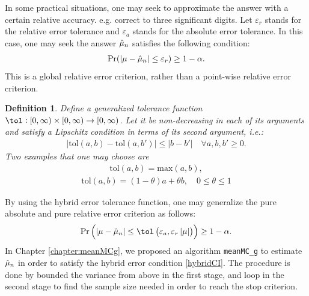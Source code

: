 \documentclass{iitthesis}
\newtheorem{defn}{Definition}[theorem]
\begin{document}
In some practical situations, one may seek to approximate the answer with a certain relative accuracy. e.g. correct to three significant digits. Let $\varepsilon_r$ stands for the relative error tolerance and $\varepsilon_a$ stands for the absolute error tolerance. In this case, one may seek the answer $\hat{\mu}_n$ satisfies the following condition:
\begin{align}\label{relCI}
\Pr(\left \lvert \mu-\hat{\mu}_n \right \rvert\leq \varepsilon_r) \geq 1-\alpha.
\end{align}
This is a global relative error criterion, rather than a point-wise relative error criterion. 
\begin{defn}\label{def:tolfun}
 Define a generalized tolerance function $\tol: [0, \infty) \times [0, \infty) \to [0,\infty)$. Let it be non-decreasing in each of its arguments and satisfy a Lipschitz condition in terms of its second argument, i.e.:
\begin{align}
|\text{tol}(a,b)-\text{tol}(a,b')| \leq |b-b'| \quad \forall a,b,b' \geq 0.
\end{align}
Two examples that one may choose are
\begin{align}
\text{tol}(a,b) = \text{max} (a,b),
\end{align}
\begin{align}
\text{tol}(a,b) = (1- \theta) a + \theta b, \quad 0 \leq \theta \leq 1
\end{align}
\end{defn}By using the hybrid error tolerance function, one may generalize the pure absolute and pure relative error criterion as follows:
\begin{align}\label{hybridCI}
\Pr\left(\abs{\mu-\hmu_n}\leq \tol\left(\varepsilon_a, \varepsilon_r\abs{\mu}\right)\right) \geq 1-\alpha.
\end{align}
In Chapter \ref{chapter:meanMCg}, we proposed an algorithm {\tt meanMC\_g} to estimate $\hat{\mu}_n$ in order to satisfy the hybrid error condition \eqref{hybridCI}. The procedure is done by bounded the variance from above in the first stage, and loop in the second stage to find the sample size needed in order to reach the stop criterion.
\end{document}
